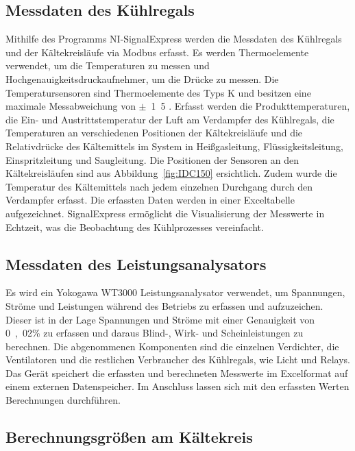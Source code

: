 \subsection{Messdaten des Kühlregals}
\label{subsec:Messdaten der Klimakammer}

Mithilfe des Programms NI-SignalExpress werden die Messdaten des Kühlregals und der Kältekreisläufe via Modbus erfasst. Es werden Thermoelemente verwendet, um die Temperaturen zu messen und Hochgenauigkeitsdruckaufnehmer, um die Drücke zu messen. Die Temperatursensoren sind Thermoelemente des Typs K und besitzen eine maximale Messabweichung von $\pm$~\unit{1.5}{\kelvin} \cite{WIKAAlexanderWiegandSE&Co.KG.2016}. Erfasst werden die Produkttemperaturen, die Ein- und Austrittstemperatur der Luft am Verdampfer des Kühlregals, die Temperaturen an verschiedenen Positionen der Kältekreisläufe und die Relativdrücke des Kältemittels im System in Heißgasleitung, Flüssigkeitsleitung, Einspritzleitung und Saugleitung. Die Positionen der Sensoren an den Kältekreisläufen sind aus Abbildung~\ref{fig:IDC150} ersichtlich. Zudem wurde die Temperatur des Kältemittels nach jedem einzelnen Durchgang durch den Verdampfer erfasst.
Die erfassten Daten werden in einer Exceltabelle aufgezeichnet. SignalExpress ermöglicht die Visualisierung der Messwerte in Echtzeit, was die Beobachtung des Kühlprozesses vereinfacht.

\subsection{Messdaten des Leistungsanalysators}
\label{subsec:Messdaten des Leistungsanalysators}

Es wird ein Yokogawa WT3000 Leistungsanalysator verwendet, um Spannungen, Ströme und Leistungen während des Betriebs zu erfassen und aufzuzeichen. Dieser ist in der Lage Spannungen und Ströme mit einer Genauigkeit von \unit{0,02}{\%} zu erfassen und daraus Blind-, Wirk- und Scheinleistungen zu berechnen. Die abgenommenen Komponenten sind die einzelnen Verdichter, die Ventilatoren und die restlichen Verbraucher des Kühlregals, wie Licht und Relays. Das Gerät speichert die erfassten und berechneten Messwerte im Excelformat auf einem externen Datenspeicher.
Im Anschluss lassen sich mit den erfassten Werten Berechnungen durchführen.


\subsection{Berechnungsgrößen am Kältekreis}
\label{subsec:Berechnungsgrössen}

